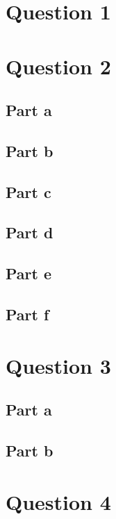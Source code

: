 \documentclass[a3paper 12pt]{article}
\begin{document}
\hypersetup{pageanchor=false}

\hypersetup{pageanchor=true}

\tableofcontents
\clearpage
\setlength{\abovedisplayskip}{-20pt}%
\setlength{\belowdisplayskip}{-10pt}%
\setlength{\abovedisplayshortskip}{0pt}%
\setlength{\belowdisplayshortskip}{0pt}%
\setlength{\jot}{0pt}%
\section{Question 1}

\section{Question 2}
\subsection{Part a}

\subsection{Part b}

\subsection{Part c}

\subsection{Part d}

\subsection{Part e}

\subsection{Part f}

\section{Question 3}
\subsection{Part a}

\subsection{Part b}

\section{Question 4}
\end{document}
